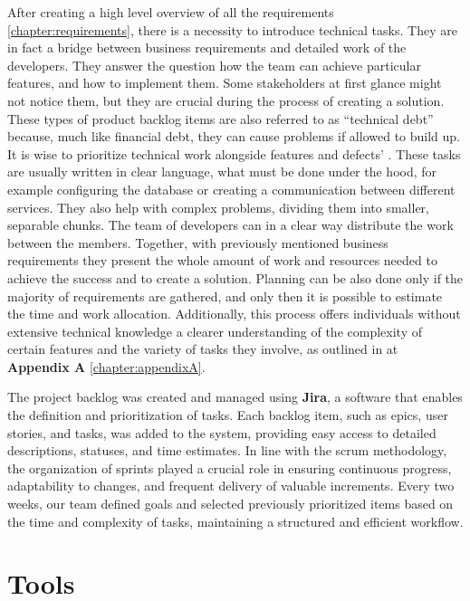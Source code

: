 After creating a high level overview of all the requirements \ref{chapter:requirements}, there is a necessity to introduce technical tasks. They are in fact a bridge between business requirements and detailed work of the developers. They answer the question how the team can achieve particular features, and how to implement them. Some stakeholders at first glance might not notice them, but they are crucial during the process of creating a solution. These types of product backlog items are also referred to as “technical debt” because, much like financial debt, they can cause problems if allowed to build up. It is wise to prioritize technical work alongside features and defects' \cite{TechnicalTaskBacklog}. These tasks are usually written in clear language, what must be done under the hood, for example configuring the database or creating a communication between different services. They also help with complex problems, dividing them into smaller, separable chunks. The team of developers can in a clear way distribute the work between the members. Together, with previously mentioned business requirements they present the whole amount of work and resources needed to achieve the success and to create a solution. Planning can be also done only if the majority of requirements are gathered, and only then it is possible to estimate the time and work allocation. Additionally, this process offers individuals without extensive technical knowledge a clearer understanding of the complexity of certain features and the variety of tasks they involve, as outlined in  at \textbf{Appendix A} \ref{chapter:appendixA}.
\par
The project backlog was created and managed using \textbf{Jira}, a software that enables the definition and prioritization of tasks. Each backlog item, such as epics, user stories, and tasks, was added to the system, providing easy access to detailed descriptions, statuses, and time estimates. In line with the scrum methodology, the organization of sprints played a crucial role in ensuring continuous progress, adaptability to changes, and frequent delivery of valuable increments. Every two weeks, our team defined goals and selected previously prioritized items based on the time and complexity of tasks, maintaining a structured and efficient workflow. 


\section{Tools}
